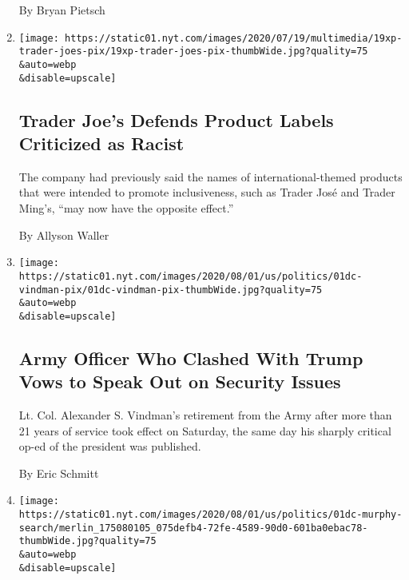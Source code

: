 \begin{enumerate}
  By Bryan Pietsch
\item
  \href{/2020/08/01/us/trader-joes-jose-ming-joe-san.html}{}

  \texttt{[image: https://static01.nyt.com/images/2020/07/19/multimedia/19xp-trader-joes-pix/19xp-trader-joes-pix-thumbWide.jpg?quality=75\\\&auto=webp\\\&disable=upscale]}

  \hypertarget{trader-joes-defends-product-labels-criticized-as-racist}{%
  \subsection{Trader Joe's Defends Product Labels Criticized as
  Racist}\label{trader-joes-defends-product-labels-criticized-as-racist}}

  The company had previously said the names of international-themed
  products that were intended to promote inclusiveness, such as Trader
  José and Trader Ming's, ``may now have the opposite effect.''

  By Allyson Waller
\item
  \href{/2020/08/01/us/politics/alexander-vindman-impeachment-trump.html}{}

  \texttt{[image: https://static01.nyt.com/images/2020/08/01/us/politics/01dc-vindman-pix/01dc-vindman-pix-thumbWide.jpg?quality=75\\\&auto=webp\\\&disable=upscale]}

  \hypertarget{army-officer-who-clashed-with-trump-vows-to-speak-out-on-security-issues}{%
  \subsection{Army Officer Who Clashed With Trump Vows to Speak Out on
  Security
  Issues}\label{army-officer-who-clashed-with-trump-vows-to-speak-out-on-security-issues}}

  Lt. Col. Alexander S. Vindman's retirement from the Army after more
  than 21 years of service took effect on Saturday, the same day his
  sharply critical op-ed of the president was published.

  By Eric Schmitt
\item
  \href{/2020/08/01/us/politics/brian-murphy-homeland-security-protesters.html}{}

  \texttt{[image: https://static01.nyt.com/images/2020/08/01/us/politics/01dc-murphy-search/merlin\_175080105\_075defb4-72fe-4589-90d0-601ba0ebac78-thumbWide.jpg?quality=75\\\&auto=webp\\\&disable=upscale]}

  \hypertarget{homeland-security-reassigns-official-whose-office-compiled-intelligence-on-journalists}{%
}
\end{enumerate}
